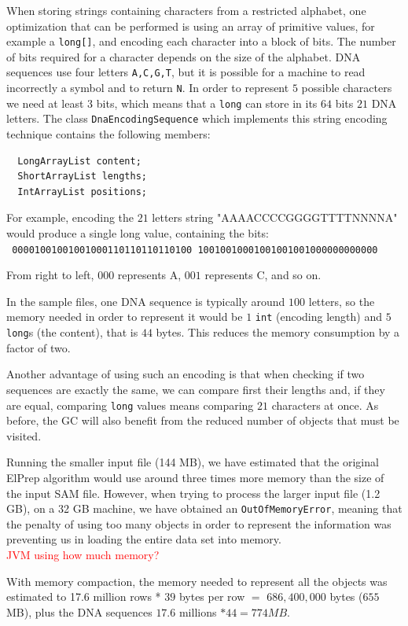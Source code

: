\documentclass[a4paper,twoside]{article}
\begin{document}
When storing strings containing characters from a restricted alphabet, one optimization that can be performed is using an array of primitive values, for example a {\tt long[]}, and encoding each character into a block of bits. The number of bits required for a character depends on the size of the alphabet.
DNA sequences use four letters {\tt A,C,G,T}, but it is possible for a machine to read incorrectly a symbol and to return {\tt N}. In order to represent $5$ possible characters we need at least $3$ bits,
which means that a {\tt long} can store in its $64$ bits $21$ DNA letters. 
The class {\tt DnaEncodingSequence} which implements this string encoding technique contains the following members:
\begin{verbatim}
  LongArrayList content;
  ShortArrayList lengths;      
  IntArrayList positions;     
\end{verbatim}
For example, encoding the $21$ letters string "AAAACCCCGGGGTTTTNNNNA" would produce a single long value, containing the bits:\\
{\tt
00001001001001000110110110110100
10010010001001001001000000000000
}

From right to left, $000$ represents A, $001$ represents C, and so on.

In the sample files, one DNA sequence is typically around $100$ letters, so the memory needed in order to represent it would be $1$ {\tt int} (encoding length) and $5$ {\tt long}s (the content), that is $44$ bytes. This reduces the memory consumption by a factor of two.

Another advantage of using such an encoding is that when checking if two sequences are exactly the same, we can compare first their lengths and, if they are equal, comparing {\tt long} values means comparing $21$ characters at once.
As before, the GC will also benefit from the reduced number of objects that must be visited.




Running the smaller input file (144 MB), we have estimated that the original ElPrep algorithm would use around three times more memory than the size of the input SAM file.
However, when trying to process the larger input file (1.2 GB), on a 32 GB machine, we have obtained an {\tt OutOfMemoryError}, meaning that the penalty of using too many objects in order to represent the information was preventing us in loading the entire data set into memory.
\\ \textcolor{red}{JVM using how much memory?}

With memory compaction, the memory needed to represent all the objects was estimated to 17.6 million rows * $39$ bytes per row $=$ $686,400,000$ bytes ($655$ MB), plus the DNA sequences  $17.6$ millions $* 44 = 774 MB$.
\end{document}
